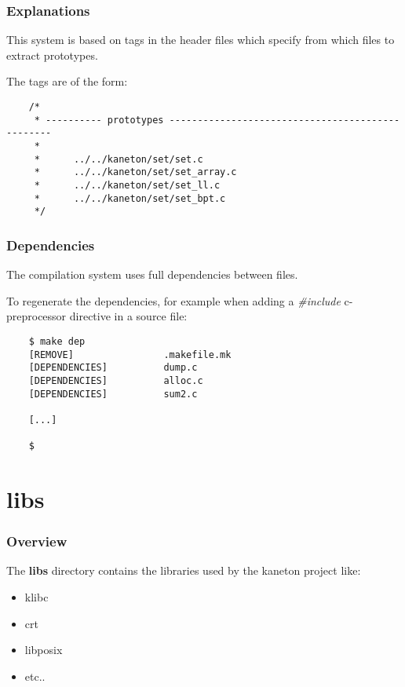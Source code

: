 \begin{frame}[containsverbatim]
  \frametitle{Explanations}

  This system is based on tags in the header files which specify
  from which files to extract prototypes.

  \nl

  The tags are of the form:

  \begin{verbatim}
    /*
     * ---------- prototypes -------------------------------------------------
     *
     *      ../../kaneton/set/set.c
     *      ../../kaneton/set/set_array.c
     *      ../../kaneton/set/set_ll.c
     *      ../../kaneton/set/set_bpt.c
     */
  \end{verbatim}
\end{frame}


\begin{frame}[containsverbatim]
  \frametitle{Dependencies}

  The compilation system uses full dependencies between files.

  \nl

  To regenerate the dependencies, for example when adding a
  \textit{\#include} c-preprocessor directive in a source file:

  \begin{verbatim}
    $ make dep
    [REMOVE]                .makefile.mk
    [DEPENDENCIES]          dump.c
    [DEPENDENCIES]          alloc.c
    [DEPENDENCIES]          sum2.c

    [...]

    $
  \end{verbatim}
\end{frame}

%
%

\section{libs}


\begin{frame}
  \frametitle{Overview}

  The \textbf{libs} directory contains the libraries used by the kaneton
  project like:

  \begin{itemize}
    \item
      klibc
    \item
      crt
    \item
      libposix
    \item
      etc..
  \end{itemize}
\end{frame}

